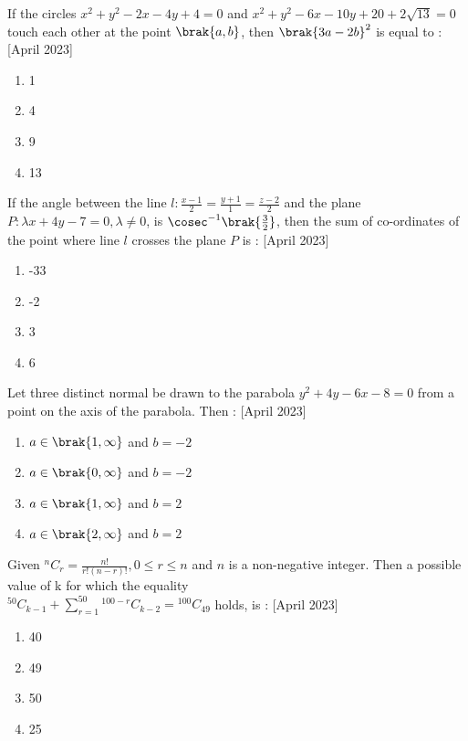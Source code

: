 \iffalse
\title{2023}
\author{EE24BTECH11066}
\section{mcq-single}
\fi
\item If the circles $x^2+y^2-2x-4y+4=0$ and $x^2+y^2-6x-10y+20+2\sqrt{13}=0$ touch each other at the point $\brak{a,b}$, then $\brak{3a-2b}^2$ is equal to : \hfill{[April 2023]}
\begin{enumerate}
    \item 1
    \item 4
    \item 9
    \item 13
\end{enumerate}

\item If the angle between the line $l:\frac{x-1}{2}=\frac{y+1}{1}=\frac{z-2}{2}$ and the plane $P:\lambda x+4y-7=0, \lambda\neq0$, is $\cosec^{-1}\brak{\frac{3}{2}}$, then the sum of co-ordinates of the point where line $l$ crosses the plane $P$  is : \hfill{[April 2023]}
\begin{enumerate}
    \item -33
    \item -2
    \item 3
    \item 6
\end{enumerate}

\item Let three distinct normal be drawn to the parabola $y^2+4y-6x-8=0$ from a point  on the axis of the parabola. Then : \hfill{[April 2023]}
\begin{enumerate}
    \item $a \in \brak{1,\infty}$ and $b=-2$
    \item $a \in \brak{0,\infty}$ and $b=-2$
    \item $a \in \brak{1,\infty}$ and $b=2$
    \item $a \in \brak{2,\infty}$ and $b=2$
\end{enumerate}

\item Given ${}^{n}C_{r} = \frac{n!}{r!(n-r)!}, 0\leq r \leq n$ and $n$ is a non-negative integer. Then a possible value of k for which the equality\\
${}^{50}C_{k-1}+\sum_{r=1}^{50}{}^{100-r}C_{k-2}={}^{100}C_{49}$ holds, is : \hfill{[April 2023]}
\begin{enumerate}
    \item 40
    \item 49
    \item 50
    \item 25
\end{enumerate}

